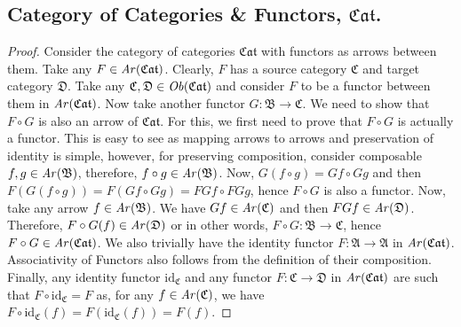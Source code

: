 \documentclass{article}
\theoremstyle{definition}
\theoremstyle{remark}
\theoremstyle{definition}
\theoremstyle{definition}
\theoremstyle{definition}
\newcommand{\cat}[1]{\mathfrak{#1}}
\newcommand{\obj}[1]{\text{\textit{Ob}}(#1)}
\newcommand{\arr}[1]{\text{\textit{Ar}}(#1)}
\newcommand{\Id}[1]{\text{id}_{#1}}
\begin{document}
\subsection{Category of Categories \& Functors, $ \cat{Cat} $.}
\label{PROOF-2}\begin{proof}
	Consider the category of categories $ \cat{Cat} $ with functors as arrows between them. Take any $ F \in \arr{\cat{Cat}} $. Clearly, $ F $ has a source category $ \cat{C} $ and target category $ \cat{D} $. Take any $ \cat{C},\cat{D} \in \obj{\cat{Cat}}$ and consider $ F $ to be a functor between them in $ \arr{\cat{Cat}} $. Now take another functor $ G : \cat{B}\to \cat{C} $. We need to show that $ F \circ G $ is also an arrow of $ \cat{Cat} $. For this, we first need to prove that $ F\circ G $ is actually a functor. This is easy to see as mapping arrows to arrows and preservation of identity is simple, however, for preserving composition, consider composable $ f,g\in \arr{\cat{B}} $, therefore, $ f\circ g \in \arr{\cat{B}} $. Now, $ G(f\circ g) = Gf \circ Gg $ and then $ F(G(f\circ g))  = F(Gf\circ Gg) = FGf\circ FGg$, hence $ F\circ G $ is also a functor. Now, take any arrow $ f\in \arr{\cat{B}} $. We have $ Gf \in \arr{\cat{C}} $ and then $ FGf \in \arr{\cat{D}} $. Therefore, $ F\circ G (f) \in \arr{\cat{D}} $ or in other words, $ F\circ G : \cat{B} \to \cat{C} $, hence $ F\circ G \in \arr{\cat{Cat}} $. We also trivially have the identity functor $ F:\cat{A} \to \cat{A} $ in $ \arr{\cat{Cat}} $. Associativity of Functors also follows from the definition of their composition. Finally, any identity functor $ \Id{\cat{C}} $ and any functor $ F : \cat{C} \to \cat{D}$ in $ \arr{\cat{Cat}} $ are such that $ F\circ \Id{\cat{C}} = F$ as, for any $ f\in \arr{\cat{C}} $, we have $ F\circ \Id{\cat{C}} (f) = F(\Id{\cat{C}}(f)) = F(f) $.
\end{proof}
\end{document}
